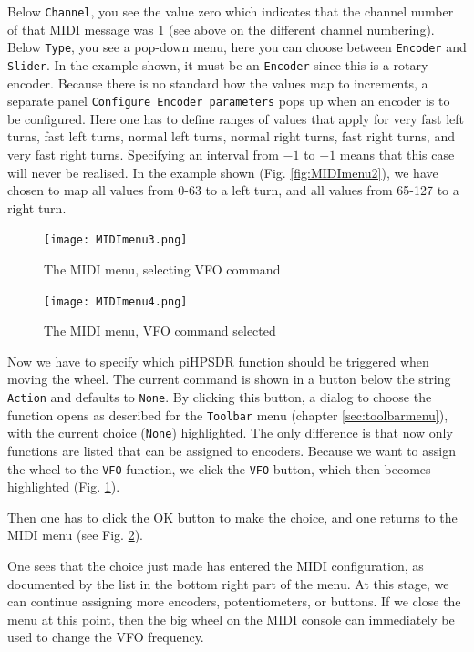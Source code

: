 \documentclass[12pt]{book}
\def\rett#1{\texttt{\color{red}#1}}
\def\bltt#1{\texttt{\color{blue}#1}}
\def\pH{pi\-HPSDR\xspace}
\begin{document}
Below \rett{Channel}, you see the value zero which
indicates that the channel number of that MIDI message was 1 (see above on the
different channel numbering). Below \rett{Type}, you see a pop-down menu, here
you can choose between \rett{Encoder} and \rett{Slider}. In the example shown,
it must be an \rett{Encoder} since this is a rotary encoder. Because there is no
standard how the values map to increments, a separate panel
\rett{Configure Encoder parameters} pops up when an encoder is to be configured.
Here one has to define ranges of values that apply for very fast left turns,
fast left turns, normal left turns, normal right turns, fast right turns,
and very fast right turns. Specifying an interval from $-1$ to $-1$ means that
this case will never be realised. In the example shown (Fig. \ref{fig:MIDImenu2}),
we have chosen to map all values from 0-63 to a left turn, and all values from 65-127
to a right turn.
\begin{figure}[ht!]
\center
\texttt{[image: MIDImenu3.png]}
\caption{The MIDI menu, selecting VFO command}
\label{fig:MIDImenu3}
\end{figure}

\begin{figure}[ht!]
\center
\texttt{[image: MIDImenu4.png]}
\caption{The MIDI menu, VFO command selected}
\label{fig:MIDImenu4}
\end{figure}
Now we have to specify which \pH function should be triggered when moving the wheel.
The current command is shown in a button below the string \rett{Action} and defaults to \bltt{None}.
By clicking this button, a dialog to choose the function opens as described for the
\bltt{Toolbar} menu (chapter \ref{sec:toolbarmenu}), with the current choice (\bltt{None})
highlighted. The only difference is that now only functions are listed that can be
assigned to encoders.
Because we want to assign the wheel to the \bltt{VFO} function, we click
the \bltt{VFO} button, which then becomes highlighted (Fig. \ref{fig:MIDImenu3}).



Then one has to click the OK button to make the choice, and one returns to the
MIDI menu (see Fig. \ref{fig:MIDImenu4}).

One sees that the choice just made has entered the MIDI configuration, as documented by the
list in the bottom right part of the menu. At this stage, we can continue
assigning more encoders, potentiometers, or buttons. If we close the menu at
this point, then the big wheel on the MIDI console can immediately be used
to change the VFO frequency.
\end{document}

